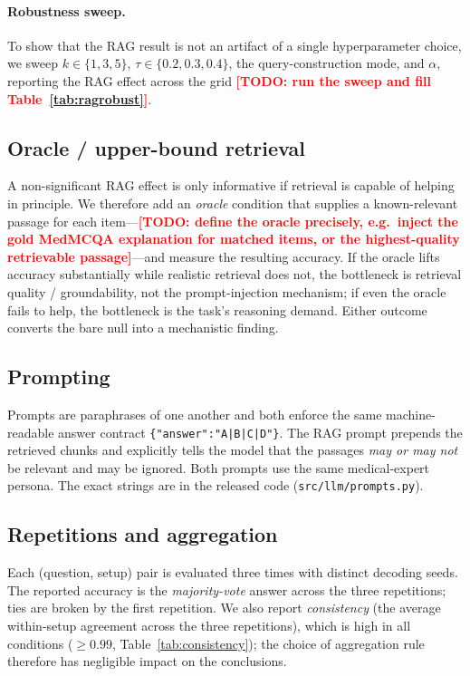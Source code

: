 \documentclass[11pt,a4paper]{article}
\newcommand{\TODO}[1]{\textcolor{red}{\textbf{[TODO: #1]}}}
\begin{document}
\paragraph{Robustness sweep.} To show that the RAG result is not an artifact of a
single hyperparameter choice, we sweep $k\in\{1,3,5\}$, $\tau\in\{0.2,0.3,0.4\}$,
the query-construction mode, and $\alpha$, reporting the RAG effect across the
grid \TODO{run the sweep and fill Table~\ref{tab:ragrobust}}.

\subsection{Oracle / upper-bound retrieval}
\label{sec:oracle}

A non-significant RAG effect is only informative if retrieval is capable of
helping in principle. We therefore add an \emph{oracle} condition that supplies a
known-relevant passage for each item---\TODO{define the oracle precisely, e.g.\
inject the gold MedMCQA explanation for matched items, or the highest-quality
retrievable passage}---and measure the resulting accuracy. If the oracle lifts
accuracy substantially while realistic retrieval does not, the bottleneck is
retrieval quality / groundability, not the prompt-injection mechanism; if even
the oracle fails to help, the bottleneck is the task's reasoning demand. Either
outcome converts the bare null into a mechanistic finding.

\subsection{Prompting}

Prompts are paraphrases of one another and both enforce the same
machine-readable answer contract \texttt{\{"answer":"A|B|C|D"\}}. The
RAG prompt prepends the retrieved chunks and explicitly tells the
model that the passages \emph{may or may not} be relevant and may be ignored.
Both prompts use the same medical-expert persona. The exact strings are in
the released code (\texttt{src/llm/prompts.py}).

\subsection{Repetitions and aggregation}

Each (question, setup) pair is evaluated three times with distinct decoding
seeds. The reported accuracy is the \emph{majority-vote} answer across the three
repetitions; ties are broken by the first repetition. We also report
\emph{consistency} (the average within-setup agreement across the three
repetitions), which is high in all conditions ($\geq 0.99$,
Table~\ref{tab:consistency}); the choice of aggregation rule therefore has
negligible impact on the conclusions.
\end{document}
